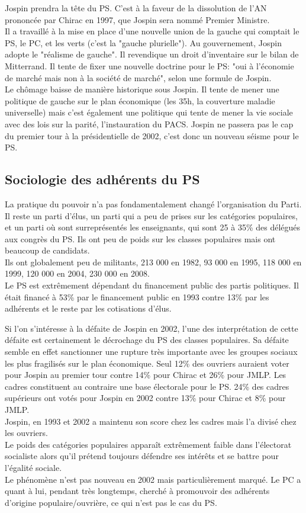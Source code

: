 \documentclass[10pt, a4paper, openany]{book}
\begin{document}
Jospin prendra la tête du PS. C'est à la faveur de la dissolution de l'AN prononcée par Chirac en 1997, que Jospin sera nommé Premier Ministre. \\
Il a travaillé à la mise en place d'une nouvelle union de la gauche qui comptait le PS, le PC, et les verts (c'est la "gauche plurielle"). Au gouvernement, Jospin adopte le "réalisme de gauche". Il revendique un droit d'inventaire sur le bilan de Mitterrand. Il tente de fixer une nouvelle doctrine pour le PS: "oui à l'économie de marché mais non à la société de marché", selon une formule de Jospin. \\
Le chômage baisse de manière historique sous Jospin. Il tente de mener une politique de gauche sur le plan économique (les 35h, la couverture maladie universelle) mais c'est également une politique qui tente de mener la vie sociale avec des lois sur la parité, l'instauration du PACS. Jospin ne passera pas le cap du premier tour à la présidentielle de 2002, c'est donc un nouveau séisme pour le PS. 

\subsection{Sociologie des adhérents du PS}

La pratique du pouvoir n'a pas fondamentalement changé l'organisation du Parti. Il reste un parti d'élus, un parti qui a peu de prises sur les catégories populaires, et un parti où sont surreprésentés les enseignants, qui sont 25 à 35\% des délégués aux congrès du PS. Ils ont peu de poids sur les classes populaires mais ont beaucoup de candidats. \\
Ils ont globalement peu de militants, 213 000 en 1982, 93 000 en 1995, 118 000 en 1999, 120 000 en 2004, 230 000 en 2008. \\
Le PS est extrêmement dépendant du financement public des partis politiques. Il était financé à 53\% par le financement public en 1993 contre 13\% par les adhérents et le reste par les cotisations d'élus. 


Si l'on s'intéresse à la défaite de Jospin en 2002, l'une des interprétation de cette défaite est certainement le décrochage du PS des classes populaires. Sa défaite semble en effet sanctionner une rupture très importante avec les groupes sociaux les plus fragilisés sur le plan économique. Seul 12\% des ouvriers auraient voter pour Jospin au premier tour contre 14\% pour Chirac et 26\% pour JMLP. Les cadres constituent au contraire une base électorale pour le PS. 24\% des cadres supérieurs ont votés pour Jospin en 2002 contre 13\% pour Chirac et 8\% pour JMLP. \\
Jospin, en 1993 et 2002 a maintenu son score chez les cadres mais l'a divisé chez les ouvriers. \\
Le poids des catégories populaires apparaît extrêmement faible dans l'électorat socialiste alors qu'il prétend toujours défendre ses intérêts et se battre pour l'égalité sociale. \\
Le phénomène n'est pas nouveau en 2002 mais particulièrement marqué. Le PC a quant à lui, pendant très longtemps, cherché à promouvoir des adhérents d'origine populaire/ouvrière, ce qui n'est pas le cas du PS.
\end{document}
